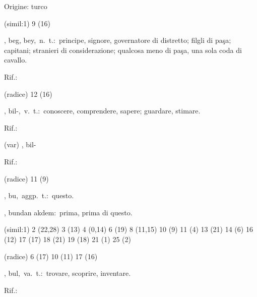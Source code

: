 \begin{glossario}{Origine: turco}
\begin{subvocedue}
\item[(simil:1)]   9 (16)
\end{subvocedue}
\item[{\color{colorlowref}\spzrl{beg}},] {\sf beg, bey},\ n.\ t.:\ principe, signore, governatore di distretto; filgli di paşa; capitani; stranieri di considerazione; qualcosa meno di paşa, una sola coda di cavallo.
\begin{subvocedue}
\item[Rif.:] 
\end{subvocedue}
\begin{subvocedue}
\item[(radice)]   12 (16)
\end{subvocedue}
\item[{\color{colorlowref}\spzrl{bilB}},] {\sf bil-},\ v.\ t.:\ conoscere, comprendere, sapere; guardare, stimare.
\begin{subvocedue}
\item[Rif.:] 
\end{subvocedue}
\begin{subvocedue}
\item[(var)] , {\sf bil-}\begin{subvocedue}
\item[Rif.:] 
\end{subvocedue}
\item[(radice)]   11 (9)
\end{subvocedue}
\item[{\color{colorlowref}\spzrl{b.U}},] {\sf bu},\ aggp.\ t.:\ questo.
\begin{subvocedue}
\item[\subglossariobullet] , {\sf bundan akdem}:\ prima, prima di questo.
\item[(simil:1)]   2 (22,28) 3 (13) 4 (0,14) 6 (19) 8 (11,15) 10 (9) 11 (4) 13 (21) 14 (6) 16 (12) 17 (17) 18 (21) 19 (18) 21 (1) 25 (2)
\item[(radice)]   6 (17) 10 (11) 17 (16)
\end{subvocedue}
\item[{\color{colorlowref}\spzrl{b.UlB}},] {\sf bul},\ va.\ t.:\ trovare, scoprire, inventare.
\begin{subvocedue}
\item[Rif.:] 
\end{subvocedue}

\end{glossario}
